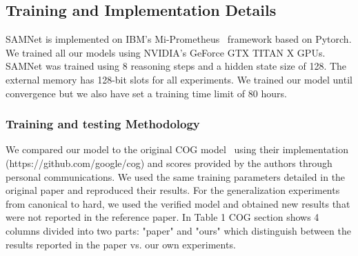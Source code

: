 %
%
%
%	
%	
%
% 

\subsection{Training and Implementation Details}

SAMNet is implemented on IBM's Mi-Prometheus~\cite{kornuta2018accelerating} framework based on Pytorch. 
We trained all our models using NVIDIA’s GeForce GTX TITAN X GPUs. SAMNet was trained using 8 reasoning steps and a hidden state size of 128. The external memory has 128-bit slots for all experiments. We trained our model until convergence but we also have set a training time limit of 80 hours.

\subsubsection{Training and testing Methodology}

We compared our model to the original COG model~\cite{yang2018dataset} using their implementation (https://github.com/google/cog) and scores provided by the authors through personal communications. We used the same training parameters detailed in the original paper and reproduced their results.  For the generalization experiments from canonical to hard, we used the verified model and obtained new results that were not reported in the reference paper.   In Table 1 COG section shows 4 columns divided into two parts: "paper" and "ours" which distinguish between the results reported in the paper vs. our own experiments.


